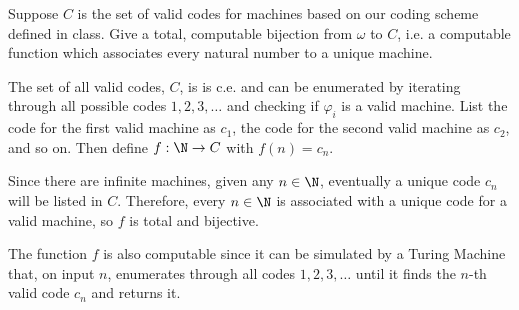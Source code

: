 \begin{problem}
  Suppose $C$ is the set of valid codes for machines based on
  our coding scheme defined in class. Give a total, computable
  bijection from $\omega$ to $C$,
  i.e. a computable function which associates every natural number
  to a unique machine. 

  \begin{answer}
    The set of all valid codes, $C$, is is c.e.
    and can be enumerated by iterating through
    all possible codes $1, 2, 3, \ldots$ and checking if
    $\varphi_i$ is a valid machine.
    List the code for the first valid machine as $c_1$,
    the code for the second valid machine as $c_2$, and so on.
    Then define $f : \N \to C$ with $f(n) = c_n$.
    
    \step
    Since there are infinite machines, given any $n \in \N$,
    eventually a unique code $c_n$ will be listed in $C$.
    Therefore, every $n \in \N$ is associated with a unique code
    for a valid machine, so $f$ is total and bijective.

    \step
    The function $f$ is also computable since it can be
    simulated by a Turing Machine that, on input $n$,
    enumerates through all codes $1, 2, 3, \ldots$
    until it finds the $n$-th valid code $c_n$ and returns it.
  \end{answer}
\end{problem}
